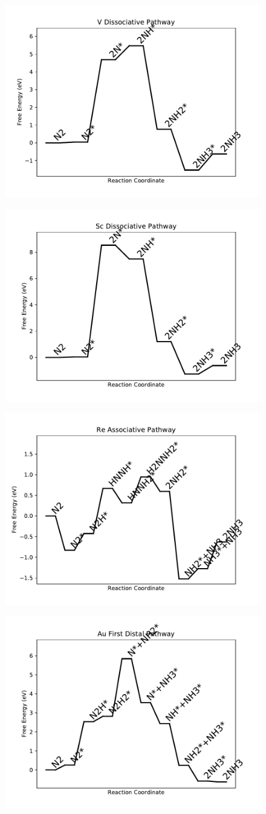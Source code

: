 \documentclass[journal=jacsat,manuscript=article]{achemso}
\begin{document}
\begin{figure}
\includegraphics[width=0.5\linewidth]{data/plots/V_dissociative.pdf}
\label{fig:V_dissociative}
\end{figure}

\begin{figure}
\includegraphics[width=0.5\linewidth]{data/plots/Sc_dissociative.pdf}
\label{fig:Sc_dissociative}
\end{figure}

\begin{figure}
\includegraphics[width=0.5\linewidth]{data/plots/Re_associative.pdf}
\label{fig:Re_associative}
\end{figure}

\begin{figure}
\includegraphics[width=0.5\linewidth]{data/plots/Au_distal_1.pdf}
\label{fig:Au_distal_1}
\end{figure}
\end{document}
